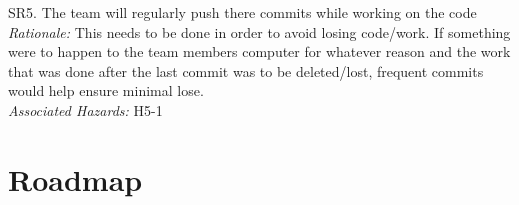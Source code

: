 \documentclass{article}
\begin{document}
SR5. The team will regularly push there commits while working on the code\\
     \indent \indent \emph{Rationale:} This needs to be done in order to avoid losing code/work. If something were to happen to the team members computer for whatever reason and the work that was done after the last commit was to be deleted/lost, frequent commits would help ensure minimal lose.\\
    \indent \indent \emph{Associated Hazards:} H5-1 \\

\section{Roadmap}

\end{document}
